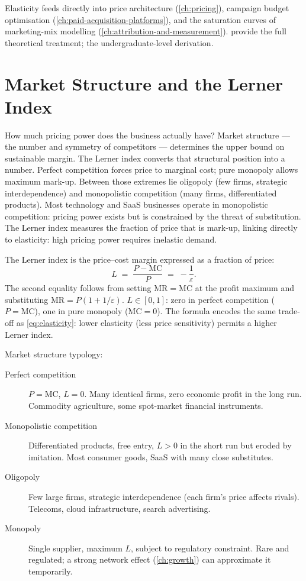 Elasticity feeds directly into price architecture (\cref{ch:pricing}), campaign budget
optimisation (\cref{ch:paid-acquisition-platforms}), and the saturation curves of marketing-mix
modelling (\cref{ch:attribution-and-measurement}). \textcite{pindyck2017} provide the full
theoretical treatment; \textcite{mankiw2020} the undergraduate-level derivation.

\section{Market Structure and the Lerner Index}\label{sec:lerner}

How much pricing power does the business actually have? Market structure --- the number and
symmetry of competitors --- determines the upper bound on sustainable margin. The Lerner index
converts that structural position into a number. Perfect competition forces price to marginal
cost; pure monopoly allows maximum mark-up. Between those extremes lie oligopoly (few firms,
strategic interdependence) and monopolistic competition (many firms, differentiated products).
Most technology and SaaS businesses operate in monopolistic competition: pricing power exists
but is constrained by the threat of substitution. The Lerner index measures the fraction of
price that is mark-up, linking directly to elasticity: high pricing power requires inelastic
demand.

The Lerner index is the price--cost margin expressed as a fraction of price:
\begin{equation}\label{eq:lerner}
  L \;=\; \frac{P - \mathrm{MC}}{P} \;=\; -\frac{1}{\varepsilon}.
\end{equation}
The second equality follows from setting \(\mathrm{MR}=\mathrm{MC}\) at the profit maximum and
substituting \(\mathrm{MR}=P(1+1/\varepsilon)\). \(L\in[0,1]\): zero in perfect competition
(\(P=\mathrm{MC}\)), one in pure monopoly (\(\mathrm{MC}=0\)). The formula encodes the same
trade-off as \cref{eq:elasticity}: lower elasticity (less price sensitivity) permits a higher
Lerner index.

Market structure typology:
\begin{description}
  \item[Perfect competition] \(P=\mathrm{MC}\), \(L=0\). Many identical firms, zero economic profit in
    the long run. Commodity agriculture, some spot-market financial instruments.
  \item[Monopolistic competition] Differentiated products, free entry, \(L>0\) in the short run but
    eroded by imitation. Most consumer goods, SaaS with many close substitutes.
  \item[Oligopoly] Few large firms, strategic interdependence (each firm's price affects rivals).
    Telecoms, cloud infrastructure, search advertising.
  \item[Monopoly] Single supplier, maximum \(L\), subject to regulatory constraint. Rare and regulated;
    a strong network effect (\cref{ch:growth}) can approximate it temporarily.
\end{description}

